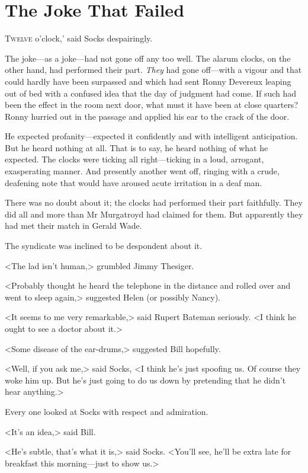 \chapter{The Joke That Failed}

\lettrine[ante=`]{T}{welve}  o'clock,' said Socks despairingly.

\zz
The joke—as a joke—had not gone off any too well. The alarum clocks, on the other hand, had performed their part. \emph{They} had gone off—with a vigour and  that could hardly have been surpassed and which had sent Ronny Devereux leaping out of bed with a confused idea that the day of judgment had come. If such had been the effect in the room next door, what must it have been at close quarters? Ronny hurried out in the passage and applied his ear to the crack of the door.

He expected profanity—expected it confidently and with intelligent anticipation. But he heard nothing at all. That is to say, he heard nothing of what he expected. The clocks were ticking all right—ticking in a loud, arrogant, exasperating manner. And presently another went off, ringing with a crude, deafening note that would have aroused acute irritation in a deaf man.

There was no doubt about it; the clocks had performed their part faithfully. They did all and more than Mr Murgatroyd had claimed for them. But apparently they had met their match in Gerald Wade.

The syndicate was inclined to be despondent about it.

<The lad isn't human,> grumbled Jimmy Thesiger.

<Probably thought he heard the telephone in the distance and rolled over and went to sleep again,> suggested Helen (or possibly Nancy).

<It seems to me very remarkable,> said Rupert Bateman seriously. <I think he ought to see a doctor about it.>

<Some disease of the ear-drums,> suggested Bill hopefully.

<Well, if you ask me,> said Socks, <I think he's just spoofing us. Of course they woke him up. But he's just going to do us down by pretending that he didn't hear anything.>

Every one looked at Socks with respect and admiration.

<It's an idea,> said Bill.

<He's subtle, that's what it is,> said Socks. <You'll see, he'll be extra late for breakfast this morning—just to show us.>


